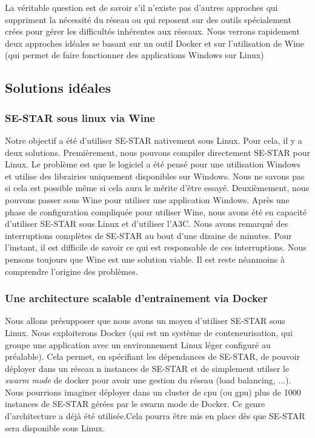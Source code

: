 La véritable question est de savoir s'il n'existe pas d'autres approches qui suppriment la nécessité du réseau ou qui reposent sur des outils spécialement crées pour gérer les difficultés inhérentes aux réseaux. Nous verrons rapidement deux approches idéales se basant sur un outil Docker \cite{Merkel:2014:DLL:2600239.2600241} et sur l'utilisation de \gls{Wine} (qui permet de faire fonctionner des applications Windows sur Linux)

\subsection{Solutions idéales}

\subsubsection{SE-STAR sous linux via \gls{Wine}}
Notre objectif a été d'utiliser SE-STAR nativement sous Linux. Pour cela, il y a deux solutions. 
Premièrement, nous pouvons compiler directement SE-STAR pour Linux. Le problème est que le logiciel a été pensé pour une utilisation Windows et utilise des librairies uniquement disponibles sur Windows. Nous ne savons pas si cela est possible même si cela aura le mérite d'être essayé. 
Deuxièmement, nous pouvons passer sous Wine pour utiliser une application Windows. Après une phase de configuration compliquée pour utiliser Wine, nous avons été en capacité d'utiliser SE-STAR sous Linux et d'utiliser l'\gls{A3C}. Nous avons remarqué des interruptions complètes de SE-STAR au bout d'une dizaine de minutes. Pour l'instant, il est difficile de savoir ce qui est responsable de ces interruptions. Nous pensons toujours que Wine est une solution viable. Il est reste néanmoins à comprendre l'origine des problèmes.

\subsubsection{Une architecture scalable d'entrainement via Docker}
Nous allons présupposer que nous avons un moyen d'utiliser SE-STAR sous Linux. Nous exploiterons Docker (qui est un système de conteneurisation, qui groupe une application avec un environnement Linux léger configuré au préalable). Cela permet, en spécifiant les dépendances de SE-STAR, de pouvoir déployer dans un réseau n instances de SE-STAR et de simplement utilser le \emph{swarm mode} de docker pour avoir une gestion du réseau (load balancing, ...). Nous  pourrions imaginer déployer dans un cluster de cpu (ou gpu) plus de 1000 instances de SE-STAR gérées par le swarm mode de Docker. Ce genre d'architecture a déjà été utilisée.Cela pourra être mis en place dès que SE-STAR sera disponible sous Linux.


